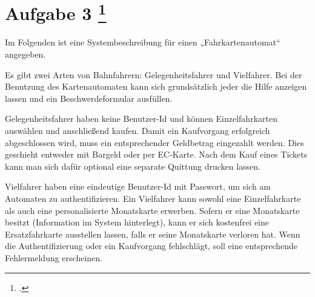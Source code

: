 \documentclass{lehramt-informatik-aufgabe}
\begin{document}
\section{Aufgabe 3
\footcite{66116:2020:09}}

Im Folgenden ist eine Systembeschreibung für einen „Fahrkartenautomat“
angegeben.

Es gibt zwei Arten von Bahnfahrern: Gelegenheitsfahrer und Vielfahrer.
Bei der Benutzung des Kartenautomaten kann sich grundsätzlich jeder die
Hilfe anzeigen lassen und ein Beschwerdeformular ausfüllen.

Gelegenheitsfahrer haben keine Benutzer-Id und können Einzelfahrkarten
auswählen und anschließend kaufen. Damit ein Kaufvorgang erfolgreich
abgeschlossen wird, muss ein entsprechender Geldbetrag eingezahlt
werden. Dies geschieht entweder mit Bargeld oder per EC-Karte. Nach dem
Kauf eines Tickets kann man sich dafür optional eine separate Quittung
drucken lassen.

Vielfahrer haben eine eindeutige Benutzer-Id mit Passwort, um sich am
Automaten zu authentifizieren. Ein Vielfahrer kann sowohl eine
Einzelfahrkarte als auch eine personalisierte Monatskarte erwerben.
Sofern er eine Monatskarte besitzt (Information im System hinterlegt),
kann er sich kostenfrei eine Ersatzfahrkarte ausstellen lassen, falls er
seine Monatskarte verloren hat. Wenn die Authentifizierung oder ein
Kaufvorgang fehlschlägt, soll eine entsprechende Fehlermeldung
erscheinen.
\end{document}
